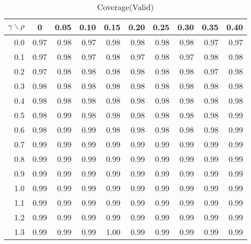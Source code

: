\documentclass[12pt]{article}
\begin{document}
%
\begin{table}[!tbp]
\caption{Coverage(Valid)}
 \begin{center}
 \begin{tabular}{r|rrrrrrrrr}\hline\hline
\multicolumn{1}{c|}{$\gamma\backslash\rho$}&\multicolumn{1}{c}{0}&\multicolumn{1}{c}{0.05}&\multicolumn{1}{c}{0.10}&\multicolumn{1}{c}{0.15}&\multicolumn{1}{c}{0.20}&\multicolumn{1}{c}{0.25}&\multicolumn{1}{c}{0.30}&\multicolumn{1}{c}{0.35}&\multicolumn{1}{c}{0.40}\tabularnewline
\hline

0.0&0.97&0.98&0.97&0.98&0.98&0.98&0.98&0.97&0.97\tabularnewline
0.1&0.97&0.98&0.97&0.98&0.97&0.98&0.97&0.98&0.98\tabularnewline
0.2&0.97&0.98&0.98&0.98&0.98&0.98&0.98&0.97&0.98\tabularnewline
0.3&0.98&0.98&0.98&0.98&0.98&0.98&0.98&0.98&0.98\tabularnewline
0.4&0.98&0.98&0.98&0.98&0.98&0.98&0.98&0.98&0.98\tabularnewline
0.5&0.98&0.99&0.98&0.98&0.98&0.98&0.98&0.98&0.99\tabularnewline
0.6&0.98&0.99&0.99&0.98&0.98&0.98&0.98&0.98&0.99\tabularnewline
0.7&0.99&0.99&0.99&0.99&0.99&0.99&0.99&0.99&0.99\tabularnewline
0.8&0.99&0.99&0.99&0.99&0.99&0.99&0.99&0.99&0.99\tabularnewline
0.9&0.99&0.99&0.99&0.99&0.99&0.99&0.99&0.99&0.99\tabularnewline
1.0&0.99&0.99&0.99&0.99&0.99&0.99&0.99&0.99&0.99\tabularnewline
1.1&0.99&0.99&0.99&0.99&0.99&0.99&0.99&0.99&0.99\tabularnewline
1.2&0.99&0.99&0.99&0.99&0.99&0.99&0.99&0.99&0.99\tabularnewline
1.3&0.99&0.99&0.99&1.00&0.99&0.99&0.99&0.99&0.99\tabularnewline
\hline
\end{tabular}

\end{center}

\end{table}
\end{document}
